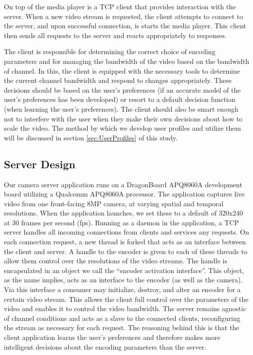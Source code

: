 \documentclass[a4paper,12pt]{article}
\begin{document}
On top of the media player is a TCP client that provides interaction with the server. When a new video stream is requested, the client attempts to connect to the server, and upon successful connection, is starts the media player. This client then sends all requests to the server and reacts appropriately to responses.

The client is responsible for determining the correct choice of encoding parameters and for managing the bandwidth of the video based on the bandwidth of channel. In this, the client is equipped with the necessary tools to determine the current channel bandwidth and respond to changes appropriately. These decisions should be based on the user's preferences (if an accurate model of the user’s preferences has been developed) or resort to a default decision function (when learning the user’s preferences). The client should also be smart enough not to interfere with the user when they make their own decisions about how to scale the video. The method by which we develop user profiles and utilize them will be discussed in section \ref{sec:UserProfiles} of this study.

\subsection{Server Design}

Our camera server application runs on a DragonBoard APQ8060A development board utilizing a Qualcomm APQ8060A processor. The application captures live video from one front-facing 8MP camera, at varying spatial and temporal resolutions. When the application launches, we set these to a default of 320x240 at 30 frames per second (fps). Running as a daemon in the application, a TCP server handles all incoming connections from clients and services any requests. On each connection request, a new thread is forked that acts as an interface between the client and server. A handle to the encoder is given to each of these threads to allow them control over the resolutions of the video streams. The handle is encapsulated in an object we call the ``encoder activation interface''. This object, as the name implies, acts as an interface to the encoder (as well as the camera). Via this interface a consumer may initialize, destroy, and alter an encoder for a certain video stream. This allows the client full control over the parameters of the video and enables it to control the video bandwidth. The server remains agnostic of channel conditions and acts as a slave to the connected clients, reconfiguring the stream as necessary for each request. The reasoning behind this is that the client application learns the user’s preferences and therefore makes more intelligent decisions about the encoding parameters than the server.
\end{document}
